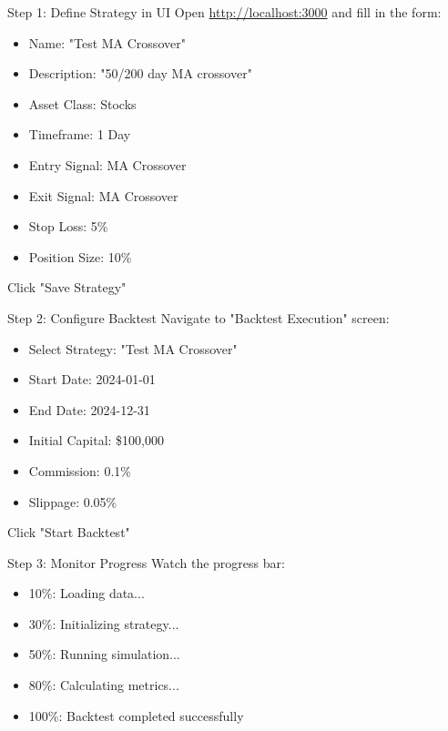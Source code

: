 \documentclass[11pt,a4paper]{article}
\begin{document}
\begin{example}{Step 1: Define Strategy in UI}
Open \url{http://localhost:3000} and fill in the form:
\begin{itemize}
  \item Name: "Test MA Crossover"
  \item Description: "50/200 day MA crossover"
  \item Asset Class: Stocks
  \item Timeframe: 1 Day
  \item Entry Signal: MA Crossover
  \item Exit Signal: MA Crossover
  \item Stop Loss: 5\%
  \item Position Size: 10\%
\end{itemize}
Click "Save Strategy"
\end{example}

\begin{example}{Step 2: Configure Backtest}
Navigate to "Backtest Execution" screen:
\begin{itemize}
  \item Select Strategy: "Test MA Crossover"
  \item Start Date: 2024-01-01
  \item End Date: 2024-12-31
  \item Initial Capital: \$100,000
  \item Commission: 0.1\%
  \item Slippage: 0.05\%
\end{itemize}
Click "Start Backtest"
\end{example}

\begin{example}{Step 3: Monitor Progress}
Watch the progress bar:
\begin{itemize}
  \item 10\%: Loading data...
  \item 30\%: Initializing strategy...
  \item 50\%: Running simulation...
  \item 80\%: Calculating metrics...
  \item 100\%: Backtest completed successfully
\end{itemize}
\end{example}
\end{document}
